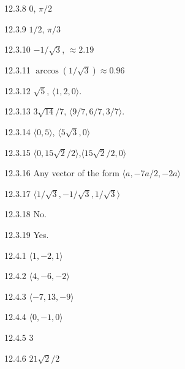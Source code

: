 \begin{Answer}{12.3.8}
	$0$, $\pi/2$
\end{Answer}
\begin{Answer}{12.3.9}
	$1/2$, $\pi/3$
\end{Answer}
\begin{Answer}{12.3.10}
	$-1/\sqrt3$, $\approx 2.19$
\end{Answer}
\begin{Answer}{12.3.11}
	$\arccos(1/\sqrt3)\approx 0.96$
\end{Answer}
\begin{Answer}{12.3.12}
	$\sqrt{5}$, $\langle 1,2,0\rangle$.
\end{Answer}
\begin{Answer}{12.3.13}
	$3\sqrt{14}/7$, $\langle 9/7,6/7,3/7\rangle$.
\end{Answer}
\begin{Answer}{12.3.14}
	$\langle 0,5\rangle$, $\langle 5\sqrt3,0\rangle$
\end{Answer}
\begin{Answer}{12.3.15}
	$\langle 0,15\sqrt2/2\rangle$,$\langle 15\sqrt2/2,0\rangle$
\end{Answer}
\begin{Answer}{12.3.16}
	Any vector of the form $\langle a, -7a/2, -2a\rangle$
\end{Answer}
\begin{Answer}{12.3.17}
	$\langle 1/\sqrt3,-1/\sqrt3,1/\sqrt3\rangle$
\end{Answer}
\begin{Answer}{12.3.18}
	No.
\end{Answer}
\begin{Answer}{12.3.19}
	Yes.
\end{Answer}
\begin{Answer}{12.4.1}
	$\langle 1,-2,1\rangle$
\end{Answer}
\begin{Answer}{12.4.2}
	$\langle 4,-6,-2\rangle$
\end{Answer}
\begin{Answer}{12.4.3}
	$\langle -7,13,-9\rangle$
\end{Answer}
\begin{Answer}{12.4.4}
	$\langle 0,-1,0\rangle$
\end{Answer}
\begin{Answer}{12.4.5}
	$3$
\end{Answer}
\begin{Answer}{12.4.6}
	$21\sqrt2/2$
\end{Answer}
